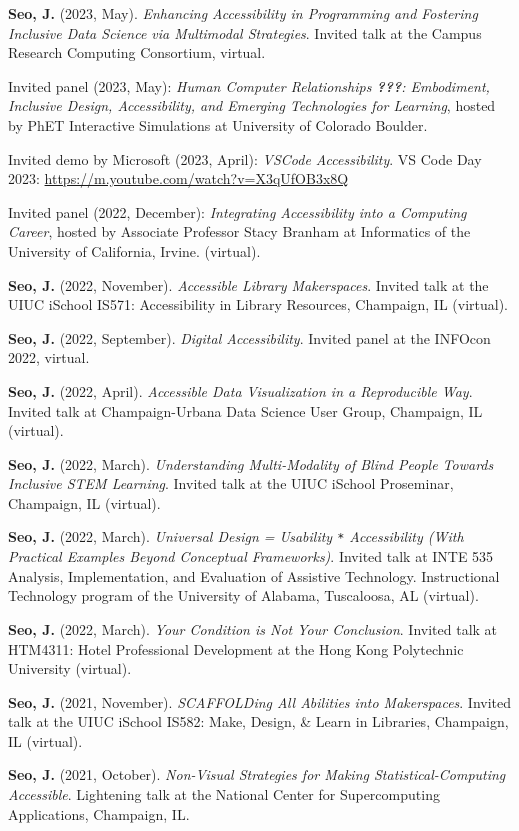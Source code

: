 \documentclass[11pt,a4paper,]{awesome-cv}
\begin{document}
\textbf{Seo, J.} (2023, May). \emph{Enhancing Accessibility in
Programming and Fostering Inclusive Data Science via Multimodal
Strategies}. Invited talk at the Campus Research Computing Consortium,
virtual.

Invited panel (2023, May): \emph{Human Computer Relationships
{\textbf{???}}: Embodiment, Inclusive Design, Accessibility, and
Emerging Technologies for Learning}, hosted by PhET Interactive
Simulations at University of Colorado Boulder.

Invited demo by Microsoft (2023, April): \emph{VSCode Accessibility}. VS
Code Day 2023: \url{https://m.youtube.com/watch?v=X3qUfOB3x8Q}

Invited panel (2022, December): \emph{Integrating Accessibility into a
Computing Career}, hosted by Associate Professor Stacy Branham at
Informatics of the University of California, Irvine. (virtual).

\textbf{Seo, J.} (2022, November). \emph{Accessible Library
Makerspaces}. Invited talk at the UIUC iSchool IS571: Accessibility in
Library Resources, Champaign, IL (virtual).

\textbf{Seo, J.} (2022, September). \emph{Digital Accessibility}.
Invited panel at the INFOcon 2022, virtual.

\textbf{Seo, J.} (2022, April). \emph{Accessible Data Visualization in a
Reproducible Way}. Invited talk at Champaign-Urbana Data Science User
Group, Champaign, IL (virtual).

\textbf{Seo, J.} (2022, March). \emph{Understanding Multi-Modality of
Blind People Towards Inclusive STEM Learning}. Invited talk at the UIUC
iSchool Proseminar, Champaign, IL (virtual).

\textbf{Seo, J.} (2022, March). \emph{Universal Design = Usability
\texttt{*} Accessibility (With Practical Examples Beyond Conceptual
Frameworks)}. Invited talk at INTE 535 Analysis, Implementation, and
Evaluation of Assistive Technology. Instructional Technology program of
the University of Alabama, Tuscaloosa, AL (virtual).

\textbf{Seo, J.} (2022, March). \emph{Your Condition is Not Your
Conclusion}. Invited talk at HTM4311: Hotel Professional Development at
the Hong Kong Polytechnic University (virtual).

\textbf{Seo, J.} (2021, November). \emph{SCAFFOLDing All Abilities into
Makerspaces}. Invited talk at the UIUC iSchool IS582: Make, Design, \&
Learn in Libraries, Champaign, IL (virtual).

\textbf{Seo, J.} (2021, October). \emph{Non-Visual Strategies for Making
Statistical-Computing Accessible}. Lightening talk at the National
Center for Supercomputing Applications, Champaign, IL.
\end{document}
